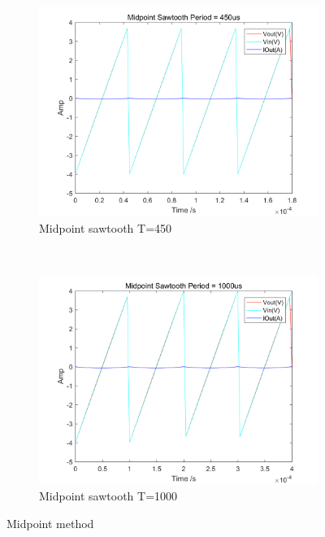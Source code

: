 \documentclass[a4paper, 12pt]{article}
\begin{document}
\begin{figure}[h]
\begin{subfigure}[b]{0.4\textwidth}
            \includegraphics[width=\textwidth]{ex1/new_mid_sawtooth_450.PNG}
            \caption{Midpoint sawtooth T=450}
      \end{subfigure}
       ~
      \begin{subfigure}[b]{0.4\textwidth}
            \includegraphics[width=\textwidth]{ex1/new_midpoint_saw_1000.png}
            \caption{Midpoint sawtooth T=1000}
      \end{subfigure}
      \caption{Midpoint method}
\end{figure}
\newpage
\end{document}
